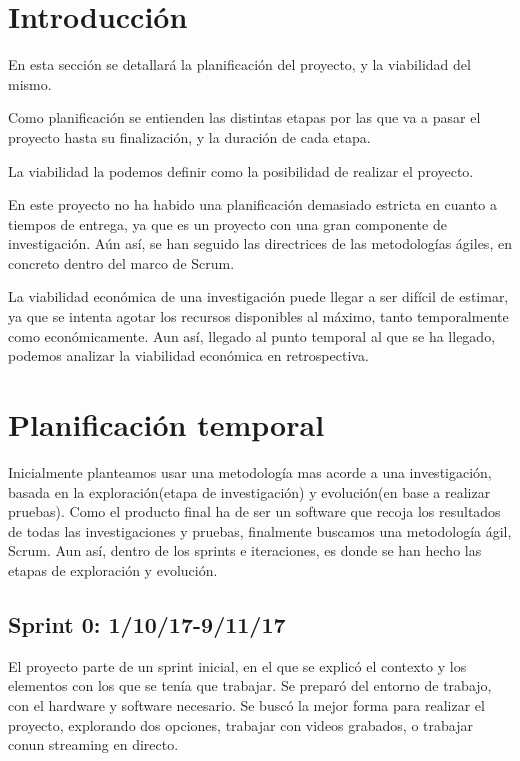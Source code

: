 
\section{Introducción}
\cite{koza92}
En esta sección se detallará la planificación del proyecto, y la viabilidad del mismo. 

Como planificación se entienden las distintas etapas por las que va a pasar el proyecto hasta su finalización, y la duración de cada etapa.

La viabilidad la podemos definir como la posibilidad de realizar el proyecto.

En este proyecto no ha habido una planificación demasiado estricta en cuanto a tiempos de entrega, ya que es un proyecto con una gran componente de investigación. Aún así, se han seguido las directrices de las metodologías ágiles, en concreto dentro del marco de Scrum\cite{scrum}.

La viabilidad económica de una investigación puede llegar a ser difícil de estimar, ya que se intenta agotar los recursos disponibles al máximo, tanto temporalmente como económicamente. Aun así, llegado al punto temporal al que se ha llegado, podemos analizar la viabilidad económica en retrospectiva.

\section{Planificación temporal}
Inicialmente planteamos usar una metodología mas acorde a una investigación, basada en la exploración(etapa de investigación) y evolución(en base a realizar pruebas). Como el producto final ha de ser un software que recoja los resultados de todas las investigaciones y pruebas, finalmente buscamos una metodología ágil, Scrum. Aun así, dentro de los sprints e iteraciones, es donde se han hecho las etapas de exploración y evolución.

\subsection{Sprint 0: 1/10/17-9/11/17}
El proyecto parte de un sprint inicial, en el que se explicó el contexto y los elementos con los que se tenía que trabajar. Se preparó del entorno de trabajo, con el hardware y software necesario. Se buscó la mejor forma para realizar el proyecto, explorando dos opciones, trabajar con videos grabados, o trabajar conun streaming en directo.

